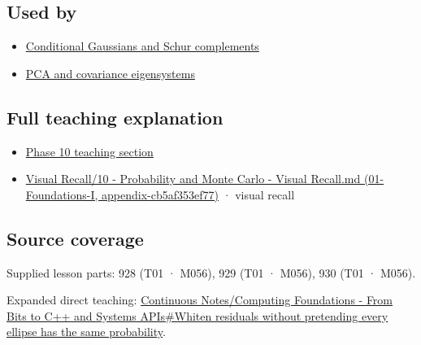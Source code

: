 \subsection{Used by}\label{appendix-12bbe185dbe5-used-by}

\begin{itemize}
\tightlist
\item
  \hyperref[appendix-f0437ea55a47]{Conditional Gaussians and Schur complements}
\item
  \hyperref[appendix-ad175ef3c5bf]{PCA and covariance eigensystems}
\end{itemize}

\subsection{Full teaching explanation}\label{appendix-12bbe185dbe5-full-teaching-explanation}

\begin{itemize}
\tightlist
\item
  \hyperref[02-foundations-ii-ch024-waiting-times-event-counts-and-covariance-geometry]{Phase 10 teaching section}
\item
  \href{../01-Foundations-I/main.pdf\#nameddest=appendix-cb5af353ef77}{Visual Recall/10 - Probability and Monte Carlo - Visual Recall.md (01-Foundations-I, appendix-cb5af353ef77)} · visual recall
\end{itemize}

\subsection{Source coverage}\label{appendix-12bbe185dbe5-source-coverage}

Supplied lesson parts: 928 (T01 · M056), 929 (T01 · M056), 930 (T01 · M056).

Expanded direct teaching: \hyperref[02-foundations-ii-ch023-whiten-residuals-without-pretending-every-ellipse-has-the-same-probability]{Continuous Notes/Computing Foundations - From Bits to C++ and Systems APIs\#Whiten residuals without pretending every ellipse has the same probability}.
